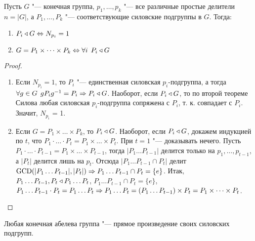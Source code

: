 \documentclass[main]{subfiles}
\begin{document}

\begin{theorem}
  Пусть \( G \) "--- конечная группа,
  \( p_1, \dots, p_k \) "--- все
  различные простые делители \(n = |G| \),
  а \( P_1, \dots, P_k \) "---
  соответствующие силовские подгруппы в \( G \).
  Тогда:
  \begin{enumerate}
    \item \( P_i \triangleleft G \Leftrightarrow N_{p_i} = 1 \)
    \item \( G = P_1 \times \dots \times P_k \Leftrightarrow
      \forall {i} \; \, P_i \triangleleft G \)
  \end{enumerate}
\end{theorem}
\begin{proof}~
  \begin{enumerate}
    \item Если \( N_{p_i} = 1 \), то \( P_i \) "---
      единственная силовская \( p_i \)-подгруппа,
      а тогда
      \( \forall {g \in G} \; \, g P_i g^{-1} = P_i \Rightarrow P_i \triangleleft G \).
      Наоборот, если \( P_i \triangleleft G \),
      то по второй теореме Силова
      любая силовская \( p_i \)-подгруппа
      сопряжена с \( P_i \),
      т. к. совпадает с \( P_i \).
      Значит, \( N_{p_i} \) = 1.

    \item Если \( G = P_1 \times \dots \times P_k \),
      то \( P_i \triangleleft G \).
      Наоборот,
      если \( P_i \triangleleft G \),
      докажем индукцией по \( t \),
      что \( P_1 \cdot \dots \cdot P_t = P_1 \times \dots \times P_t \).
      При \( t = 1 \) "--- доказывать нечего.
      Пусть \( P_1 \cdot \dots \cdot P_{t - 1} =
      P_1 \times \dots \times P_{t - 1} \),
      тогда \( |P_1 \dots P_{t - 1}| \) делится
      только на \( p_1, \dots, p_{t - 1} \), а \( |P_t| \) делится лишь
      на \( p_t \).
      Отсюда \( |P_1 \dots P_{t - 1} \cap P_t| \)
      делит \( \operatorname{GCD}( |P_1 \dots P_{t - 1}|, |P_t|) \Rightarrow
      P_1 \dots P_{t - 1} \cap P_t = \{ e \} \).
      Итак, \( P_1 \dots P_{t - 1}, P_t \triangleleft P_1 \dots P_t \),
      \( P_1 \dots P_{t - 1} \cap P_t = \{ e \} \),
      \( P_1 \dots P_{t - 1} \cdot P_t = P_1 \dots P_t \Rightarrow
      P_1 \dots P_t = (P_1 \dots P_{t - 1}) \times P_t =
      P_1 \times \dots \times P_t \).
      \qedhere
  \end{enumerate}
\end{proof}
\begin{corollary}
  Любая конечная абелева группа "---
  прямое произведение своих силовских подгрупп.
\end{corollary}
\end{document}
